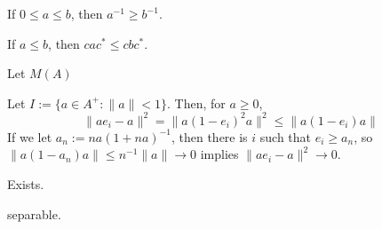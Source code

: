 \documentclass{../../large}
\begin{document}



\begin{prb}
\begin{parts}
\item If $0\le a\le b$, then $a^{-1}\ge b^{-1}$.
\item If $a\le b$, then $cac^*\le cbc^*$.
\end{parts}
\end{prb}





\begin{prb}
Let $M(A)$


Let $I:=\{a\in A^+:\|a\|<1\}$.
Then,
for $a\ge0$,
\[\|ae_i-a\|^2=\|a(1-e_i)^2a\|^2\le\|a(1-e_i)a\|\]
If we let $a_n:=na(1+na)^{-1}$, then there is $i$ such that $e_i\ge a_n$, so $\|a(1-a_n)a\|\le n^{-1}\|a\|\to0$ implies $\|ae_i-a\|^2\to0$.

\begin{parts}
\item Exists.
\item 
\item 
\item separable.
\end{parts}
\end{prb}
\end{document}
